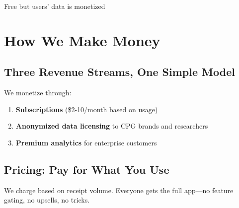 \documentclass[11pt,a4paper]{report}
\begin{document}
{\small *Free but users' data is monetized}

\chapter{How We Make Money}

\section{Three Revenue Streams, One Simple Model}

We monetize through:

\begin{enumerate}[leftmargin=2em, itemsep=4pt]
    \item \textbf{Subscriptions} (\$2-10/month based on usage)
    \item \textbf{Anonymized data licensing} to CPG brands and researchers
    \item \textbf{Premium analytics} for enterprise customers
\end{enumerate}

\section{Pricing: Pay for What You Use}

We charge based on receipt volume. Everyone gets the full app---no feature gating, no upsells, no tricks.

\begin{center}
\end{center}
\end{document}
